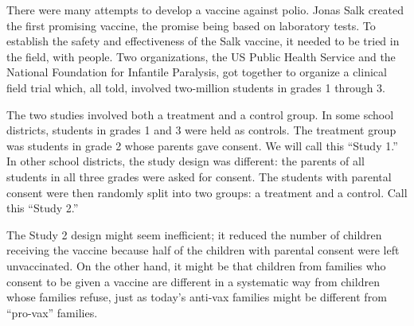 \documentclass[
  letterpaper,
  DIV=11,
  numbers=noendperiod,
  oneside]{scrartcl}
\begin{document}
There were many attempts to develop a vaccine against polio. Jonas Salk
created the first promising vaccine, the promise being based on
laboratory tests. To establish the safety and effectiveness of the Salk
vaccine, it needed to be tried in the field, with people. Two
organizations, the US Public Health Service and the National Foundation
for Infantile Paralysis, got together to organize a clinical field trial
which, all told, involved two-million students in grades 1 through 3.

The two studies involved both a treatment and a control group. In some
school districts, students in grades 1 and 3 were held as controls. The
treatment group was students in grade 2 whose parents gave consent. We
will call this ``Study 1.'' In other school districts, the study design
was different: the parents of all students in all three grades were
asked for consent. The students with parental consent were then randomly
split into two groups: a treatment and a control. Call this ``Study 2.''

The Study 2 design might seem inefficient; it reduced the number of
children receiving the vaccine because half of the children with
parental consent were left unvaccinated. On the other hand, it might be
that children from families who consent to be given a vaccine are
different in a systematic way from children whose families refuse, just
as today's anti-vax families might be different from ``pro-vax''
families.

\end{document}
